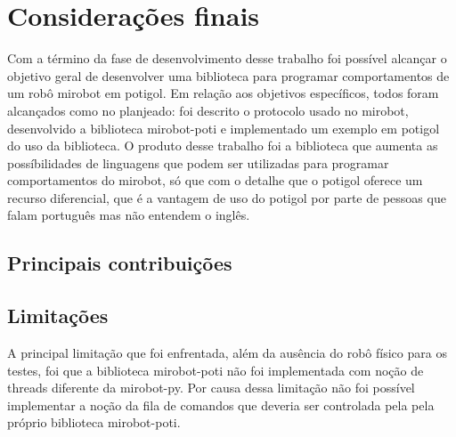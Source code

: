 \chapter{Considerações finais}
\label{cap:consideracoes}



Com a término da fase de desenvolvimento desse trabalho foi possível alcançar o
objetivo geral de desenvolver uma biblioteca para programar comportamentos de
um robô mirobot em potigol. Em relação aos objetivos específicos, todos foram
alcançados como no planjeado: foi descrito o protocolo usado no mirobot,
desenvolvido a biblioteca mirobot-poti e implementado um exemplo em potigol do
uso da biblioteca. O produto desse trabalho foi a biblioteca que aumenta as
possíbilidades de linguagens que podem ser utilizadas para programar
comportamentos do mirobot, só que com o detalhe que o potigol oferece um
recurso diferencial, que é a vantagem de uso do potigol por parte de pessoas
que falam português mas não entendem o inglês.


\section{Principais contribuições}

\section{Limitações}

A principal limitação que foi enfrentada, além da ausência do robô físico para
os testes, foi que a biblioteca mirobot-poti não foi implementada com noção de
threads diferente da mirobot-py. Por causa dessa limitação não foi possível
implementar a noção da fila de comandos que deveria ser controlada pela
pela próprio biblioteca mirobot-poti.


